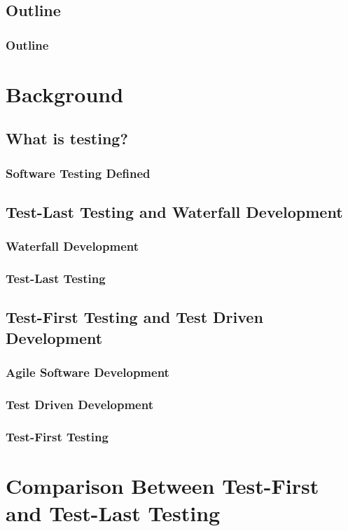 \documentclass{beamer}
\begin{document}
\subsection*{Outline}

\begin{frame}
  \frametitle{Outline}
  \tableofcontents[hideallsubsections]
\end{frame}

\section[Background]{Background}
\subsection{What is testing?}

\begin{frame}
\frametitle{Software Testing Defined}
\end{frame}

\subsection{Test-Last Testing and Waterfall Development}

\begin{frame}
\frametitle{Waterfall Development}
\end{frame}

\begin{frame}
\frametitle{Test-Last Testing}
\end{frame}

\subsection{Test-First Testing and Test Driven Development}

\begin{frame}
\frametitle{Agile Software Development}
\end{frame}

\begin{frame}
\frametitle{Test Driven Development}
\end{frame}

\begin{frame}
\frametitle{Test-First Testing}
\end{frame}

\section[Comparison of Testing Methods]{Comparison Between Test-First and Test-Last Testing}
\end{document}
